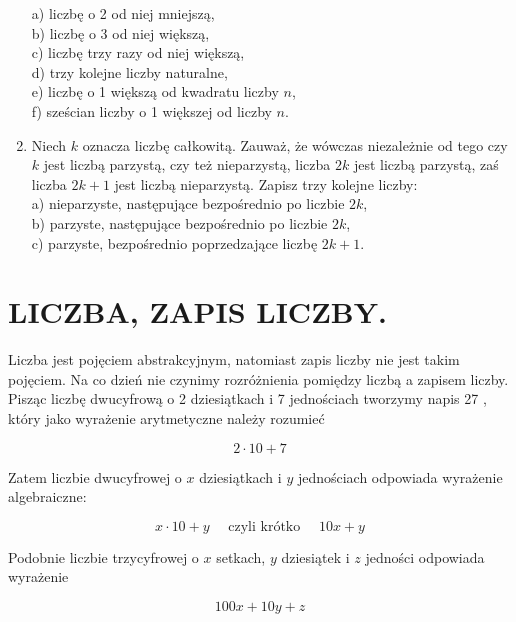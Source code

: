 \documentclass[10pt]{article}
\begin{document}
\begin{enumerate}
a) liczbę o 2 od niej mniejszą,\\
b) liczbę o 3 od niej większą,\\
c) liczbę trzy razy od niej większą,\\
d) trzy kolejne liczby naturalne,\\
e) liczbę o 1 większą od kwadratu liczby \(n\),\\
f) sześcian liczby o 1 większej od liczby \(n\).
  \item Niech \(k\) oznacza liczbę całkowitą. Zauważ, że wówczas niezależnie od tego czy \(k\) jest liczbą parzystą, czy też nieparzystą, liczba \(2 k\) jest liczbą parzystą, zaś liczba \(2 k+1\) jest liczbą nieparzystą. Zapisz trzy kolejne liczby:\\
a) nieparzyste, następujące bezpośrednio po liczbie \(2 k\),\\
b) parzyste, następujące bezpośrednio po liczbie \(2 k\),\\
c) parzyste, bezpośrednio poprzedzające liczbę \(2 k+1\).
\end{enumerate}

\section*{LICZBA, ZAPIS LICZBY.}
Liczba jest pojęciem abstrakcyjnym, natomiast zapis liczby nie jest takim pojęciem. Na co dzień nie czynimy rozróżnienia pomiędzy liczbą a zapisem liczby. Pisząc liczbę dwucyfrową o 2 dziesiątkach i 7 jednościach tworzymy napis 27 , który jako wyrażenie arytmetyczne należy rozumieć

\[
2 \cdot 10+7
\]

Zatem liczbie dwucyfrowej o \(x\) dziesiątkach i \(y\) jednościach odpowiada wyrażenie algebraiczne:

\[
x \cdot 10+y \quad \text { czyli krótko } \quad 10 x+y
\]

Podobnie liczbie trzycyfrowej o \(x\) setkach, \(y\) dziesiątek i \(z\) jedności odpowiada wyrażenie

\[
100 x+10 y+z
\]
\end{document}
